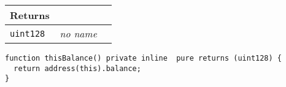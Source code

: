 \ifsoltables
\noindent\begin{tabular}{|l|l|p{5cm}|}\hline
\multicolumn{3}{|l|}{\bf Returns}\\\hline
\tt uint128 & {\em no name} &\\\hline
\end{tabular}
\fi

\vspace{2cm}

\begin{lstlisting}[firstnumber=599]
function thisBalance() private inline  pure returns (uint128) {
  return address(this).balance;
}
\end{lstlisting}
